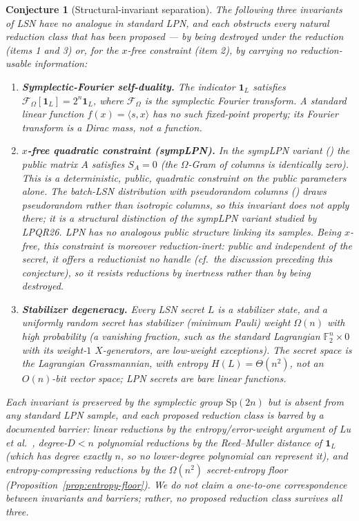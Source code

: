 \documentclass[11pt,a4paper]{article}
\theoremstyle{plain}
\newtheorem{conjecture}[theorem]{Conjecture}
\theoremstyle{definition}
\newcommand{\F}{\mathbb{F}}
\newcommand{\etal}{\textit{et al.}}
\begin{document}
\begin{conjecture}[Structural-invariant separation]
\label{conj:source}
The following three invariants of LSN have no analogue in standard LPN, and each obstructs every natural reduction class that has been proposed --- by being destroyed under the reduction (items 1 and 3) or, for the $x$-free constraint (item 2), by carrying no reduction-usable information:
\begin{enumerate}
\item \textbf{Symplectic-Fourier self-duality.} The indicator $\mathbf{1}_L$ satisfies $\mathcal{F}_\Omega[\mathbf{1}_L] = 2^n \mathbf{1}_L$, where $\mathcal{F}_\Omega$ is the symplectic Fourier transform. A standard linear function $f(x)=\langle s,x\rangle$ has no such fixed-point property; its Fourier transform is a Dirac mass, not a function.
\item \textbf{$x$-free quadratic constraint (sympLPN).} In the sympLPN variant () the public matrix $A$ satisfies $S_A=0$ (the $\Omega$-Gram of columns is identically zero). This is a deterministic, public, quadratic constraint on the \emph{public parameters} alone. The batch-LSN distribution with pseudorandom columns () draws pseudorandom rather than isotropic columns, so this invariant does not apply there; it is a structural distinction of the sympLPN variant studied by LPQR26. LPN has no analogous public structure linking its samples. Being $x$-free, this constraint is moreover \emph{reduction-inert}: public and independent of the secret, it offers a reductionist no handle (cf.\ the discussion preceding this conjecture), so it resists reductions by inertness rather than by being destroyed.
\item \textbf{Stabilizer degeneracy.} Every LSN secret $L$ is a stabilizer state, and a \emph{uniformly random} secret has stabilizer (minimum Pauli) weight $\Omega(n)$ with high probability (a vanishing fraction, such as the standard Lagrangian $\F_2^n\times 0$ with its weight-$1$ $X$-generators, are low-weight exceptions). The secret space is the Lagrangian Grassmannian, with entropy $H(L)=\Theta(n^2)$, not an $O(n)$-bit vector space; LPN secrets are bare linear functions.
\end{enumerate}
Each invariant is preserved by the symplectic group $\mathrm{Sp}(2n)$ but is absent from any standard LPN sample, and each proposed reduction class is barred by a documented barrier: linear reductions by the entropy/error-weight argument of Lu \etal\ \cite{LPQR26}, degree-$D<n$ polynomial reductions by the Reed--Muller distance of $\mathbf{1}_L$ (which has degree exactly $n$, so no lower-degree polynomial can represent it), and entropy-compressing reductions by the $\Omega(n^2)$ secret-entropy floor (Proposition~\ref{prop:entropy-floor}). We do not claim a one-to-one correspondence between invariants and barriers; rather, no proposed reduction class survives all three.
\end{conjecture}
\end{document}
